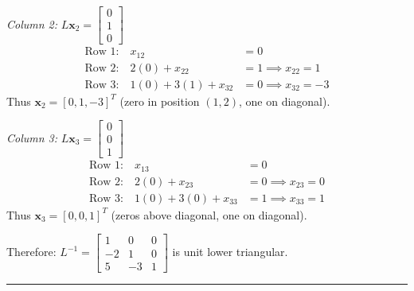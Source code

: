 \textit{Column 2:} $L\mathbf{x}_2 = \begin{bmatrix} 0 \\ 1 \\ 0 \end{bmatrix}$
\begin{align*}
\text{Row 1:} \quad x_{12} &= 0 \\
\text{Row 2:} \quad 2(0) + x_{22} &= 1 \implies x_{22} = 1 \\
\text{Row 3:} \quad 1(0) + 3(1) + x_{32} &= 0 \implies x_{32} = -3
\end{align*}
Thus $\mathbf{x}_2 = [0, 1, -3]^T$ (zero in position $(1,2)$, one on diagonal).

\textit{Column 3:} $L\mathbf{x}_3 = \begin{bmatrix} 0 \\ 0 \\ 1 \end{bmatrix}$
\begin{align*}
\text{Row 1:} \quad x_{13} &= 0 \\
\text{Row 2:} \quad 2(0) + x_{23} &= 0 \implies x_{23} = 0 \\
\text{Row 3:} \quad 1(0) + 3(0) + x_{33} &= 1 \implies x_{33} = 1
\end{align*}
Thus $\mathbf{x}_3 = [0, 0, 1]^T$ (zeros above diagonal, one on diagonal).

Therefore: $L^{-1} = \begin{bmatrix} 1 & 0 & 0 \\ -2 & 1 & 0 \\ 5 & -3 & 1 \end{bmatrix}$ is unit lower triangular.

\vspace{2em}
\noindent\rule{\textwidth}{0.4pt}
